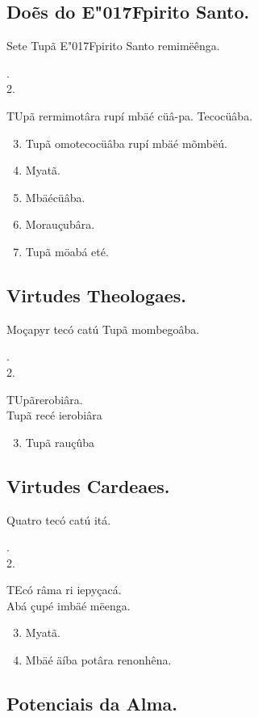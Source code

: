 \documentclass[openany,titlepage,12pt]{book}
\newcommand{\lgS}{\char"017F}
\newcommand{\comecalista}[5]{
    \hspace*{-11.7pt}
    \begin{minipage}[t]{0.08\linewidth}
        \flushright #1\\#2
    \end{minipage}
    \hspace{0pt}
    \begin{minipage}[t]{0.94\linewidth}
        \lettrine
        [findent =2pt, nindent=0pt,  lines=2]
        {#3}{#4}#5
    \end{minipage}
    \vspace*{-3pt}
}
\begin{document}
\subsection{Doẽs do E\lgS pirito Santo.}
\unskip
\vspace*{-2pt}
\begin{center}
    Sete Tupã E\lgS pirito Santo remimëênga.
\end{center}
\unskip
\comecalista{1.}{2.}{T}{U}
    {pã rermimotâra rupí mbäé cüâ-pa. Tecocüâba.}
\begin{enumerate}
    \setcounter{enumi}{2}
    \item Tupã omotecocüâba rupí mbäé mõmbëú.
    \item Myatã.
    \item Mbäécüâba.
    \item Morauçubâra.
    \item Tupã möabá eté.
\end{enumerate}

\subsection{Virtudes Theologaes.}

\begin{center}
    Moçapyr tecó catú Tupã mombegoâba.
\end{center}
\comecalista{1.}{2.}{T}{U}
    {pãrerobiâra.\\Tupã recé ierobiâra}
\begin{enumerate}
    \setcounter{enumi}{2}
    \item Tupã rauçûba
\end{enumerate}

\subsection{Virtudes Cardeaes.}

\begin{center}
    Quatro tecó catú itá.
\end{center}
\comecalista{1.}{2.}{T}{E}
    {có râma ri iepyçacá.\\Abá çupé imbäé mëenga.}
\begin{enumerate}
    \setcounter{enumi}{2}
    \item Myatã.
    \item Mbäé äíba potâra renonhêna.
\end{enumerate}

\subsection{Potenciais da Alma.}
\end{document}
